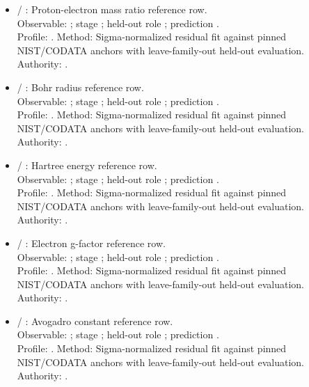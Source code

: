 \begin{itemize}
\item {} / : Proton-electron mass ratio reference row.\\ Observable: ; stage ; held-out role ; prediction .\\ Profile: . Method: Sigma-normalized residual fit against pinned NIST/CODATA anchors with leave-family-out held-out evaluation. Authority: .
\item {} / : Bohr radius reference row.\\ Observable: ; stage ; held-out role ; prediction .\\ Profile: . Method: Sigma-normalized residual fit against pinned NIST/CODATA anchors with leave-family-out held-out evaluation. Authority: .
\item {} / : Hartree energy reference row.\\ Observable: ; stage ; held-out role ; prediction .\\ Profile: . Method: Sigma-normalized residual fit against pinned NIST/CODATA anchors with leave-family-out held-out evaluation. Authority: .
\item {} / : Electron g-factor reference row.\\ Observable: ; stage ; held-out role ; prediction .\\ Profile: . Method: Sigma-normalized residual fit against pinned NIST/CODATA anchors with leave-family-out held-out evaluation. Authority: .
\item {} / : Avogadro constant reference row.\\ Observable: ; stage ; held-out role ; prediction .\\ Profile: . Method: Sigma-normalized residual fit against pinned NIST/CODATA anchors with leave-family-out held-out evaluation. Authority: .

\end{itemize}
